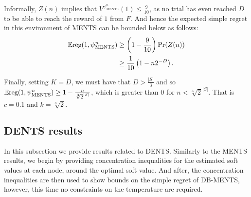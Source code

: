 \documentclass{article}
\newcommand{\reg}{\textnormal{reg}}
\theoremstyle{plain}
\newenvironment{proofoutline}{\proof[Proof outline]}{\endproof}
\begin{document}
\begin{appendices}
\begin{proofoutline}
	         Informally, $Z(n)$ implies that $V^{\psi^n_{\text{MENTS}}}(1) \leq \frac{9}{10}$, as no trial has even reached $D$ to be able to reach the reward of $1$ from $F$. And hence the expected simple regret in this environment of MENTS can be bounded below as follows:
	         \begin{align}
	         	\mathbb{E}\reg(1,\psi^n_{\text{MENTS}}) & \geq \left(1-\frac{9}{10}\right) \Pr(Z(n)) \\
	         		& \geq \frac{1}{10} \left( 1-n2^{-D} \right).
	         \end{align}
	         
	         Finally, setting $K=D$, we must have that $D>\frac{|S|}{3}$ and so $\mathbb{E}\reg(1,\psi^n_{\text{MENTS}}) \geq 1 - \frac{n}{\sqrt[3]{2}^{|S|}}$, which is greater than $0$ for $n < \sqrt[3]{2}^{|S|}$. That is $c=0.1$ and $k=\sqrt[3]{2}$.
	        
        \end{proofoutline}
        
        
        
        
        
        
    
    
    
    
    
    
    




    
    
    
    
    
    \subsection{DENTS results} \label{appsec:dents_proofs}
    
        In this subsection we provide results related to DENTS. Similarly to the MENTS results, we begin by providing concentration inequalities for the estimated soft values at each node, around the optimal soft value. And after, the concentration inequalities are then used to show bounds on the simple regret of DB-MENTS, however, this time no constraints on the temperature are required.








\end{appendices}
\end{document}
